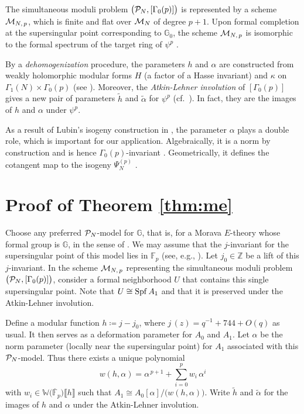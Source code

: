 \documentclass{gtpart}
\theoremstyle{definition}
\theoremstyle{remark}
\newcommand{\mb}[1]{\mathbb{#1}}
\newcommand{\Spf}{{\rm Spf\thinspace}}
\newcommand{\cF}{\overline {\mb F}}
\newcommand{\CM}{{\cal M}}
\newcommand{\CP}{{\cal P}}
\newcommand{\BF}{{\mb F}}
\newcommand{\BG}{{\mb G}}
\newcommand{\BW}{{\mb W}}
\newcommand{\BZ}{{\mb Z}}
\newcommand{\tA}{\widetilde{\A}}
\renewcommand{\th}{\widetilde{h}}
\newcommand{\A}{\alpha}
\newcommand{\G}{\Gamma}
\newcommand{\K}{\kappa}
\newcommand{\ce}{\coloneqq}
\newcommand{\lb}{\llbracket}
\newcommand{\rb}{\rrbracket}
\renewcommand{\=}{\approx}
\renewcommand{\-}{\sim}
\numberwithin{equation}{section}
\begin{document}
The simultaneous moduli problem $\big(\CP_N,[\G_0(p)]\big)$ is represented by a 
scheme $\CM_{N,\,p}$, which is finite and flat over $\CM_N$ of degree $p + 1$.  
Upon formal completion at the supersingular point corresponding to $\BG_0$, the 
scheme $\CM_{N,\,p}$ is isomorphic to the formal spectrum of the target ring of 
$\psi^p$ \cite[Theorem 1.1]{Str98}.  

By a {\em dehomogenization} procedure, the parameters $h$ and $\A$ are 
constructed from weakly holomorphic modular forms $H$ (a factor of a Hasse 
invariant) and $\K$ on $\G_1(N) \times \G_0(p)$ (see 
\cite[Proposition 2.9 and Examples 2.6 and 3.5]{ho}).  Moreover, the 
{\em Atkin-Lehner involution} of $[\G_0(p)]$ gives a new pair of parameters 
$\th$ and $\tA$ for $\psi^p$ (cf.~\cite[11.3.1]{KM}).  In fact, they are the 
images of $h$ and $\A$ under $\psi^p$.  

As a result of Lubin's isogeny construction in 
\cite[proof of Theorem 1.4]{Lubin}, the parameter $\A$ plays a double role, 
which is important for our application.  Algebraically, it is a norm by 
construction and is hence $\G_0(p)$-invariant \cite[Construction 3.1\,(ii)]{ho}.  
Geometrically, it defines the cotangent map to the isogeny $\Psi_N^{(p)}$ 
\cite[Remark 3.2]{ho}.  



\section{Proof of Theorem \ref{thm:me}}
\label{sec:pf}

Choose any preferred $\CP_N$-model for $\BG$, that is, for a Morava $E$-theory 
whose formal group is $\BG$, in the sense of \cite[Definition 3.29]{ho}.  We may 
assume that the $j$-invariant for the supersingular point of this model lies in 
$\BF_p$ (see, e.g., \cite[Theorem 14.18 and Proposition 14.15]{Cox}).  Let 
$j_0 \in \BZ$ be a lift of this $j$-invariant.  In the scheme $\CM_{N,\,p}$ 
representing the simultaneous moduli problem $\big(\CP_N,[\G_0(p)]\big)$, 
consider a formal neighborhood $U$ that contains this single supersingular 
point.  Note that $U \cong \Spf A_1$ and that it is preserved under the 
Atkin-Lehner involution.  

Define a modular function $h \ce j - j_0$, where $j\,(z) = q^{-1} + 744 + O(q)$ 
as usual.  It then serves as a deformation parameter for $A_0$ and $A_1$.  Let 
$\A$ be the norm parameter (locally near the supersingular point) for $A_1$ 
associated with this $\CP_N$-model.  Thus there exists a unique polynomial 
\begin{equation}
 \label{w}
 w(h,\A) = \A^{\,p + 1} + \sum_{i = 0}^p w_i \, \A^i 
\end{equation}
with $w_i \in \BW\big(\cF_p\big)\lb h \rb$ such that 
$A_1 \cong A_0[\A] / \big(w(h,\A)\big)$.  Write $\th$ and $\tA$ for the images 
of $h$ and $\A$ under the Atkin-Lehner involution.  
\end{document}
